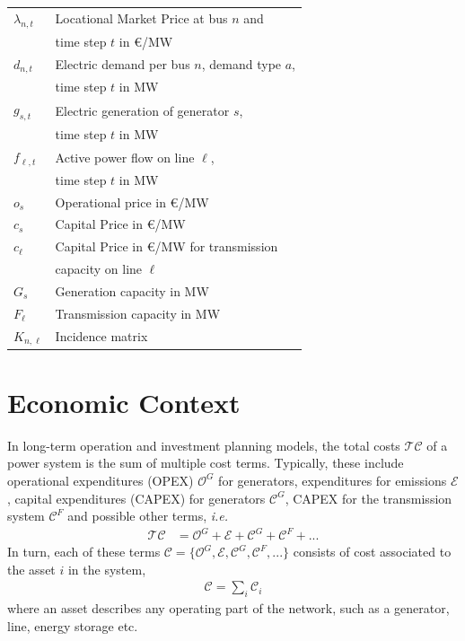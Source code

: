\documentclass[11pt,twocolumn]{article}
\newcommand{\ie}{\textit{i.e.} }
\newcommand{\vpad}{\vspace{1mm}}
\newcommand{\generation}{g_{s,t}}
\newcommand{\capacitygeneration}{G_{s}}
\newcommand{\operationalpricegeneration}{o_{s}}
\newcommand{\capitalpricegeneration}{c_{s}}
\newcommand{\flow}{f_{\ell,t}}
\newcommand{\capacityflow}{F_{\ell}}
\newcommand{\capitalpriceflow}{c_{\ell}}
\newcommand{\lmp}[1][n]{\lambda_{#1,t}}
\newcommand{\demand}[1][n]{d_{#1,t}}
\newcommand{\incidence}[1][n]{K_{#1,\ell}}
\newcommand{\totalcost}{\mathcal{TC}}
\newcommand{\cost}{\mathcal{C}}
\newcommand{\opexgeneration}{\mathcal{O}^G}
\newcommand{\capexgeneration}{\mathcal{C}^G}
\newcommand{\capexflow}{\mathcal{C}^F}
\newcommand{\emissioncost}{\mathcal{E}}
\begin{document}
\begin{table}[h]
    \centering
    \begin{tabular}{ll}
        $\lmp$ & Locational Market Price at bus $n$ and  \\ & time step $t$ in \euro/MW \vpad \\
        $\demand$ & Electric demand per bus $n$, demand type $a$, \\ & time step $t$ in MW  \vpad \\
        $\generation$ & Electric generation of generator $s$, \\ & time step $t$  in MW \vpad \\
        $\flow$ & Active power flow on line $\ell$, \\ & time step $t$ in MW   \vpad \\
        $\operationalpricegeneration$ & Operational price in \euro/MW \vpad \\
        $\capitalpricegeneration$ & Capital Price in \euro/MW \vpad \\
        $\capitalpriceflow$  & Capital Price in \euro/MW for transmission \\ & capacity on line $\ell$  \vpad \\
        $\capacitygeneration$ & Generation capacity in MW \vpad \\
        $\capacityflow$ & Transmission capacity in MW \vpad \\
        $\incidence$ & Incidence matrix \vpad 
    \end{tabular}
\end{table}

\section{Economic Context}

In long-term operation and investment planning models, the total costs $\totalcost$ of a power system is the sum of multiple cost terms. Typically, these include operational expenditures (OPEX) $\opexgeneration$ for generators, expenditures for emissions $\emissioncost$, capital expenditures (CAPEX) for generators $\capexgeneration$, CAPEX for the transmission system $\capexflow$ and possible other terms, \ie
\begin{align}
\totalcost &= \opexgeneration + \emissioncost +  \capexgeneration +  \capexflow + ...
\label{eq:total_cost}
\end{align}
In turn, each of these terms $\mathcal{C} = \{\opexgeneration, \emissioncost, \capexgeneration, \capexflow, ...\}$ consists of cost associated to the asset $i$ in the system, 
\begin{align}
    \cost = \sum_{i} \cost_{i}
    \label{eq:asset_cost}
\end{align} 
where an asset describes any operating part of the network, such as a generator, line, energy storage etc. %
\end{document}

